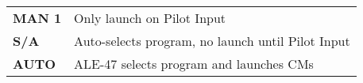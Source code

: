 
    
    \begin{tabular}{ l | l }
      \textbf{MAN 1} & Only launch on Pilot Input \\
      \textbf{S/A} & Auto-selects program, no launch until Pilot Input \\
      \textbf{AUTO} & ALE-47 selects program and launches CMs \\
    \end{tabular}

\clearpage